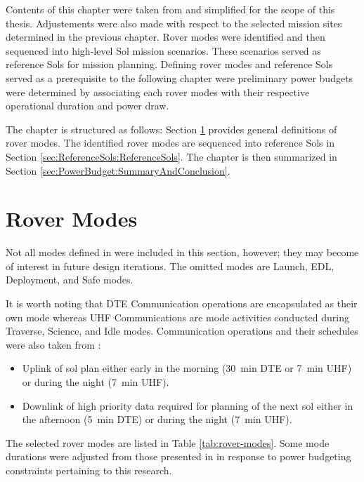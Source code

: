 Contents of this chapter were taken from  and simplified for the scope of this thesis. Adjustements were also made with respect to the selected mission sites determined in the previous chapter. Rover modes were identified and then sequenced into high-level Sol mission scenarios. These scenarios served as reference Sols for mission planning. Defining rover modes and reference Sols served as a prerequisite to the following chapter were preliminary power budgets were determined by associating each rover modes with their respective operational duration and power draw.

The chapter is structured as follows: Section \ref{sec:ReferenceSols:RoverModes} provides general definitions of rover modes. The identified rover modes are sequenced into reference Sols in Section \ref{sec:ReferenceSols:ReferenceSols}. The chapter is then summarized in Section \ref{sec:PowerBudget:SummaryAndConclusion}.

\section{Rover Modes}
\label{sec:ReferenceSols:RoverModes}
Not all modes defined in  were included in this section, however; they may become of interest in future design iterations. The omitted modes are Launch, \ac{EDL}, Deployment, and Safe modes.

It is worth noting that \ac{DTE} Communication operations are encapsulated as their own mode whereas \ac{UHF} Communications are mode activities conducted during Traverse, Science, and Idle modes. Communication operations and their schedules were also taken from :
\begin{itemize}
    \item Uplink of sol plan either early in the morning (\SI{30}{\minute} \ac{DTE} or \SI{7}{\minute} \ac{UHF}) or during the night (\SI{7}{\minute} \ac{UHF}).
    \item Downlink of high priority data required for planning of the next sol either in the afternoon (\SI{5}{\minute} \ac{DTE}) or during the night (\SI{7}{\minute} \ac{UHF}).
\end{itemize}

The selected rover modes are listed in Table \ref{tab:rover-modes}. Some mode durations were adjusted from those presented in  in response to power budgeting constraints pertaining to this research.



